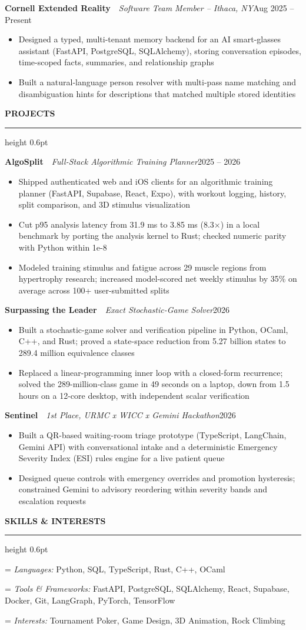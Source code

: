 \documentclass[10pt,letterpaper]{article}
\newlength{\sectiongap}   \setlength{\sectiongap}{5.0pt}
\newlength{\sectiondrop}  \setlength{\sectiondrop}{3.0pt}
\newlength{\entrygap}     \setlength{\entrygap}{2.8pt}
\newlength{\labelwd}
\newcommand{\resumesection}[1]{%
\vspace{\sectiongap}%
{\bfseries\MakeUppercase{#1}}\par
\vspace{1.5pt}%
{\color{rulegray}\hrule height 0.6pt}%
\vspace{\sectiondrop}%
}
\newcommand{\entry}[3]{%
\vspace{\entrygap}%
\textbf{#1}\ \textcolor{rulegray}{\textbar}\ \textit{#2}\hfill #3\par
\vspace{1.0pt}%
}
\newcommand{\detail}[2]{%
\settowidth{\labelwd}{\textit{#1:} }%
\hangindent=\labelwd\hangafter=1
\textit{#1:} #2\par
}
\begin{document}
\entry{Cornell Extended Reality}{Software Team Member -- Ithaca, NY}{Aug 2025 -- Present}
\begin{itemize}
\item Designed a typed, multi-tenant memory backend for an AI smart-glasses assistant (FastAPI, PostgreSQL, SQLAlchemy), storing conversation episodes, time-scoped facts, summaries, and relationship graphs
\item Built a natural-language person resolver with multi-pass name matching and disambiguation hints for descriptions that matched multiple stored identities
\end{itemize}

\resumesection{Projects}
\entry{AlgoSplit}{Full-Stack Algorithmic Training Planner}{2025 -- 2026}
\begin{itemize}
\item Shipped authenticated web and iOS clients for an algorithmic training planner (FastAPI, Supabase, React, Expo), with workout logging, history, split comparison, and 3D stimulus visualization
\item Cut p95 analysis latency from 31.9 ms to 3.85 ms (8.3$\times$) in a local benchmark by porting the analysis kernel to Rust; checked numeric parity with Python within 1e-8
\item Modeled training stimulus and fatigue across 29 muscle regions from hypertrophy research; increased model-scored net weekly stimulus by 35\% on average across 100+ user-submitted splits
\end{itemize}

\entry{Surpassing the Leader}{Exact Stochastic-Game Solver}{2026}
\begin{itemize}
\item Built a stochastic-game solver and verification pipeline in Python, OCaml, C++, and Rust; proved a state-space reduction from 5.27 billion states to 289.4 million equivalence classes
\item Replaced a linear-programming inner loop with a closed-form recurrence; solved the 289-million-class game in 49 seconds on a laptop, down from 1.5 hours on a 12-core desktop, with independent scalar verification
\end{itemize}

\entry{Sentinel}{1st Place, URMC x WICC x Gemini Hackathon}{2026}
\begin{itemize}
\item Built a QR-based waiting-room triage prototype (TypeScript, LangChain, Gemini API) with conversational intake and a deterministic Emergency Severity Index (ESI) rules engine for a live patient queue
\item Designed queue controls with emergency overrides and promotion hysteresis; constrained Gemini to advisory reordering within severity bands and escalation requests
\end{itemize}

\resumesection{Skills \& Interests}
{\small
\detail{Languages}{Python, SQL, TypeScript, Rust, C++, OCaml}
\detail{Tools \& Frameworks}{FastAPI, PostgreSQL, SQLAlchemy, React, Supabase, Docker, Git, LangGraph, PyTorch, TensorFlow}
\detail{Interests}{Tournament Poker, Game Design, 3D Animation, Rock Climbing}
}
\end{document}
